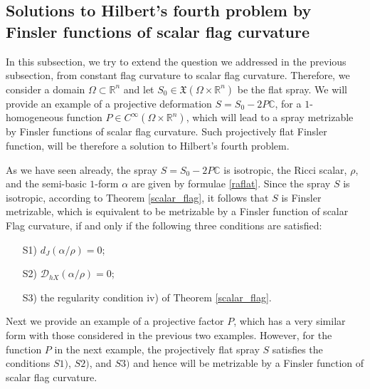 \documentclass[oneside,english]{amsart}
\numberwithin{equation}{section}
\numberwithin{figure}{section}
\theoremstyle{plain}
\theoremstyle{plain}
\theoremstyle{definition}
\theoremstyle{plain}
\theoremstyle{plain}
\theoremstyle{plain}
\theoremstyle{remark}
\theoremstyle{remark}
\begin{document}
\subsection{Solutions to Hilbert's fourth problem by Finsler functions
  of scalar flag curvature} \label{subsec:h4sc}

In this subsection, we try to extend the question we
addressed in the previous subsection, from constant flag curvature to
scalar flag curvature. Therefore, we consider a domain $\Omega\subset
\mathbb{R}^n$ and let $S_0\in
\mathfrak{X}(\Omega \times \mathbb{R}^n)$ be the flat spray.
We will provide an example of a projective deformation $S=S_0 -
2P\mathbb{C}$, for a $1$-homogeneous function $P \in C^{\infty}(\Omega
\times \mathbb{R}^n)$, which will lead to a
spray metrizable by Finsler functions of scalar flag curvature. Such 
projectively flat Finsler function, will be therefore a solution to Hilbert's fourth problem. 

As we have seen already, the spray $S=S_0 -
2P\mathbb{C}$ is isotropic, the Ricci scalar, $\rho$, and the semi-basic $1$-form
$\alpha$ are given by  formulae \eqref{raflat}. Since the spray $S$ is isotropic, according to
Theorem \ref{scalar_flag}, it follows that $S$ is Finsler metrizable,
which is equivalent to be metrizable by a Finsler function of scalar
Flag curvature, if and only if the following three conditions are satisfied:
\begin{itemize}
\item[S1)] $d_J(\alpha/\rho)=0$;
\item[S2)] $\mathcal{D}_{hX}(\alpha/\rho)=0$;
\item[S3)] the regularity condition iv) of Theorem \ref{scalar_flag}. 
\end{itemize}
Next we provide an example of a projective factor $P$, which has a
very similar form with those considered in the previous two examples. However, for
the function $P$ in the next example, the projectively flat spray $S$ satisfies the
conditions $S1)$, $S2)$, and $S3)$ and hence will be metrizable by a
Finsler function of scalar flag curvature.  
\end{document}
